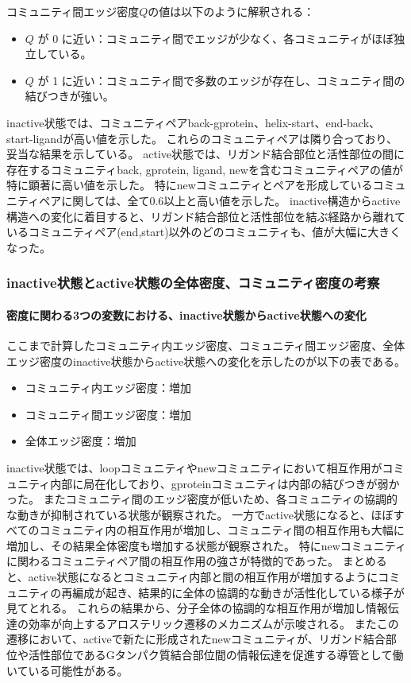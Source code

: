 コミュニティ間エッジ密度$Q$の値は以下のように解釈される：
\begin{itemize}
    \item \( Q \) が 0 に近い：コミュニティ間でエッジが少なく、各コミュニティがほぼ独立している。
    \item \( Q \) が 1 に近い：コミュニティ間で多数のエッジが存在し、コミュニティ間の結びつきが強い。
\end{itemize}

inactive状態では、コミュニティペアback-gprotein、helix-start、end-back、start-ligandが高い値を示した。
これらのコミュニティペアは隣り合っており、妥当な結果を示している。
active状態では、リガンド結合部位と活性部位の間に存在するコミュニティback, gprotein, ligand, newを含むコミュニティペアの値が特に顕著に高い値を示した。
特にnewコミュニティとペアを形成しているコミュニティペアに関しては、全て0.6以上と高い値を示した。
inactive構造からactive構造への変化に着目すると、リガンド結合部位と活性部位を結ぶ経路から離れているコミュニティペア(end,start)以外のどのコミュニティも、値が大幅に大きくなった。

\subsubsection{inactive状態とactive状態の全体密度、コミュニティ密度の考察}


\paragraph{密度に関わる3つの変数における、inactive状態からactive状態への変化}

ここまで計算したコミュニティ内エッジ密度、コミュニティ間エッジ密度、全体エッジ密度のinactive状態からactive状態への変化を示したのが以下の表である。
\begin{itemize}
    \item コミュニティ内エッジ密度：増加
    \item コミュニティ間エッジ密度：増加
    \item 全体エッジ密度：増加
\end{itemize}

inactive状態では、loopコミュニティやnewコミュニティにおいて相互作用がコミュニティ内部に局在化しており、gproteinコミュニティは内部の結びつきが弱かった。
またコミュニティ間のエッジ密度が低いため、各コミュニティの協調的な動きが抑制されている状態が観察された。
一方でactive状態になると、ほぼすべてのコミュニティ内の相互作用が増加し、コミュニティ間の相互作用も大幅に増加し、その結果全体密度も増加する状態が観察された。
特にnewコミュニティに関わるコミュニティペア間の相互作用の強さが特徴的であった。
まとめると、active状態になるとコミュニティ内部と間の相互作用が増加するようにコミュニティの再編成が起き、結果的に全体の協調的な動きが活性化している様子が見てとれる。
これらの結果から、分子全体の協調的な相互作用が増加し情報伝達の効率が向上するアロステリック遷移のメカニズムが示唆される。
またこの遷移において、activeで新たに形成されたnewコミュニティが、リガンド結合部位や活性部位であるGタンパク質結合部位間の情報伝達を促進する導管として働いている可能性がある。


